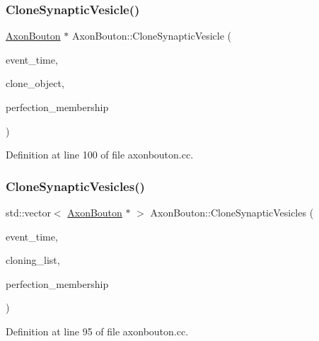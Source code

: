 \subsubsection{\texorpdfstring{Clone\+Synaptic\+Vesicle()}{CloneSynapticVesicle()}}
{\footnotesize\ttfamily \mbox{\hyperlink{class_axon_bouton}{Axon\+Bouton}} $\ast$ Axon\+Bouton\+::\+Clone\+Synaptic\+Vesicle (\begin{DoxyParamCaption}\item[{std\+::chrono\+::time\+\_\+point$<$ \mbox{\hyperlink{universe_8h_a0ef8d951d1ca5ab3cfaf7ab4c7a6fd80}{Clock}} $>$}]{event\+\_\+time,  }\item[{\mbox{\hyperlink{class_axon_bouton}{Axon\+Bouton}} $\ast$}]{clone\+\_\+object,  }\item[{double}]{perfection\+\_\+membership }\end{DoxyParamCaption})}



Definition at line 100 of file axonbouton.\+cc.

\mbox{\label{class_axon_bouton_a7bf1d8db3287dc5357d0095233f5c47f}} 
\subsubsection{\texorpdfstring{Clone\+Synaptic\+Vesicles()}{CloneSynapticVesicles()}}
{\footnotesize\ttfamily std\+::vector$<$ \mbox{\hyperlink{class_axon_bouton}{Axon\+Bouton}} $\ast$ $>$ Axon\+Bouton\+::\+Clone\+Synaptic\+Vesicles (\begin{DoxyParamCaption}\item[{std\+::chrono\+::time\+\_\+point$<$ \mbox{\hyperlink{universe_8h_a0ef8d951d1ca5ab3cfaf7ab4c7a6fd80}{Clock}} $>$}]{event\+\_\+time,  }\item[{std\+::vector$<$ \mbox{\hyperlink{class_axon_bouton}{Axon\+Bouton}} $\ast$$>$}]{cloning\+\_\+list,  }\item[{double}]{perfection\+\_\+membership }\end{DoxyParamCaption})}



Definition at line 95 of file axonbouton.\+cc.

\mbox{\label{class_axon_bouton_a2aa0abe381f6e7c87c702189d01dfbf2}} 
